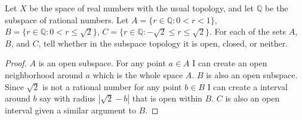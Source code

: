 \setcounter{question}{25}  %
\begin{question}[Fernandez]
  Let $X$ be the space of real numbers with the usual topology, and let $\mathbb{Q}$ be the subspace of rational numbers. Let $A=\{r\in\mathbb{Q}:0<r<1\}$, $B=\{r\in\mathbb{Q}:0<r\leq\sqrt{2}\}$, $C=\{r\in\mathbb{Q}:-\sqrt{2}\leq r\leq\sqrt{2}\}$. For each of the sets $A$, $B$, and $C$, tell whether in the subspace topology it is open, closed, or neither.
\end{question}
    
\begin{proof}
  $A$ is an open subspace. For any point $a\in A$ I can create an open neighborhood around $a$ which is the whole space $A$. $B$ is also an open subspace. Since $\sqrt{2}$ is not a rational number for any point $b\in B$ I can create a interval around $b$ say with radius $|\sqrt{2}-b|$ that is open within $B$. $C$ is also an open interval given a similar argument to $B$.
\end{proof}

